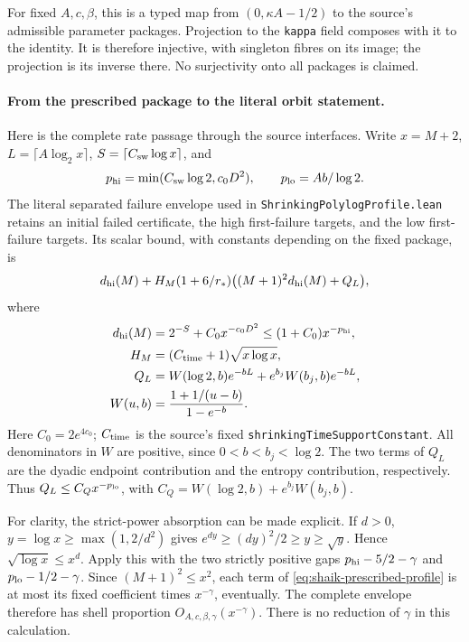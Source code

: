 \documentclass[11pt]{article}
\theoremstyle{remark}\newtheorem{remark}[proposition]{Remark}
\begin{document}
For fixed \(A,c,\beta\), this is a typed map from
\((0,\kappa A-1/2)\) to the source's admissible parameter packages.
Projection to the \texttt{kappa} field composes with it to the identity.
It is therefore injective, with singleton fibres on its image; the
projection is its inverse there. No surjectivity onto all packages is claimed.

\paragraph{From the prescribed package to the literal orbit statement.}
Here is the complete rate passage through the source interfaces.
Write \(x=M+2\), \(L=\lceil A\log_2 x\rceil\),
\(S=\lceil C_{\rm sw}\log x\rceil\), and
\[
 p_{\rm hi}=\min(C_{\rm sw}\log2,c_0D^2),\qquad
 p_{\rm lo}=Ab/\log2.
\]
The literal separated failure envelope used in
\texttt{ShrinkingPolylogProfile.lean} retains an initial failed
certificate, the high first-failure targets, and the low first-failure
targets. Its scalar bound, with constants depending on the fixed
package, is
\begin{equation}\label{eq:shaik-prescribed-profile}
 d_{\rm hi}(M)+H_M(1+6/r_*)\bigl((M+1)^2d_{\rm hi}(M)+Q_L\bigr),
\end{equation}
where
\[
 \begin{split}
 d_{\rm hi}(M)&=2^{-S}+C_0x^{-c_0D^2}
             \le(1+C_0)x^{-p_{\rm hi}},\\
 H_M&=(C_{\rm time}+1)\sqrt{x\log x},\\
 Q_L&=W(\log2,b)e^{-bL}+e^{b_j}W(b_j,b)e^{-bL},\\
 W(u,b)&=\frac{1+1/(u-b)}{1-e^{-b}} .
 \end{split}
\]
Here \(C_0=2e^{4c_0}\);
\(C_{\rm time}\) is the source's fixed
\texttt{shrinkingTimeSupportConstant}. All denominators in \(W\)
are positive, since \(0<b<b_j<\log2\).
The two terms of \(Q_L\) are the dyadic endpoint contribution and
the entropy contribution, respectively. Thus
\(Q_L\le C_Qx^{-p_{\rm lo}}\), with
\(C_Q=W(\log2,b)+e^{b_j}W(b_j,b)\).

For clarity, the strict-power absorption can be made explicit.
If \(d>0\), \(y=\log x\ge\max(1,2/d^2)\) gives
\(e^{dy}\ge(dy)^2/2\ge y\ge\sqrt y\).
Hence \(\sqrt{\log x}\le x^d\).
Apply this with the two strictly positive gaps
\(p_{\rm hi}-5/2-\gamma\) and \(p_{\rm lo}-1/2-\gamma\).
Since \((M+1)^2\le x^2\), each term of
\eqref{eq:shaik-prescribed-profile} is at most its fixed coefficient
times \(x^{-\gamma}\), eventually. The complete envelope therefore
has shell proportion \(O_{A,c,\beta,\gamma}(x^{-\gamma})\).
There is no reduction of \(\gamma\) in this calculation.
\end{document}
